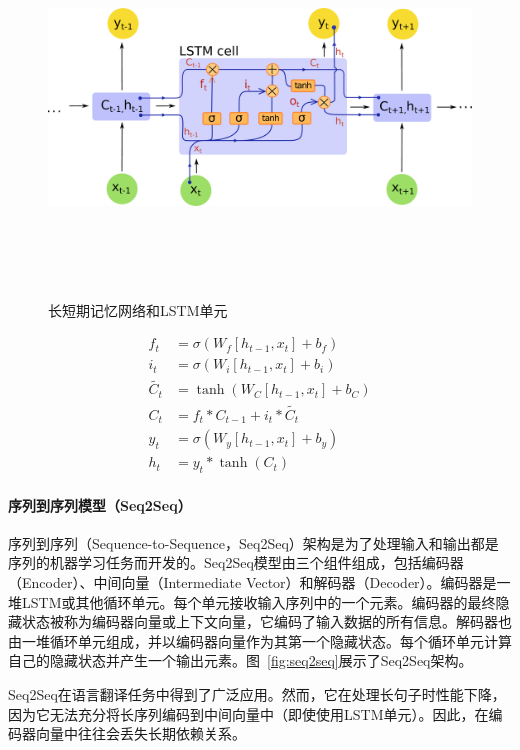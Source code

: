 \begin{figure}
\centering
\includegraphics[width=16cm,height=10cm,keepaspectratio]{lstm.pdf}
\caption{长短期记忆网络和LSTM单元}
\end{figure}
\begin{align*}
f_t &= \sigma(W_f [h_{t-1}, x_t] + b_f) \\
i_t &= \sigma(W_i [h_{t-1}, x_t] + b_i) \\
\tilde{C_t} &= \tanh(W_C [h_{t-1}, x_t] + b_C) \\
C_t &= f_t * C_{t-1} + i_t * \tilde{C_t} \\
y_t &= \sigma(W_y [h_{t-1}, x_t] + b_y) \\
h_t &= y_t * \tanh(C_t)
\end{align*}
\paragraph*{序列到序列模型（Seq2Seq）}
序列到序列（Sequence-to-Sequence，Seq2Seq）架构是为了处理输入和输出都是序列的机器学习任务而开发的。Seq2Seq模型由三个组件组成，包括编码器（Encoder）、中间向量（Intermediate Vector）和解码器（Decoder）。编码器是一堆LSTM或其他循环单元。每个单元接收输入序列中的一个元素。编码器的最终隐藏状态被称为编码器向量或上下文向量，它编码了输入数据的所有信息。解码器也由一堆循环单元组成，并以编码器向量作为其第一个隐藏状态。每个循环单元计算自己的隐藏状态并产生一个输出元素。图~\ref{fig:seq2seq}展示了Seq2Seq架构。

Seq2Seq在语言翻译任务中得到了广泛应用。然而，它在处理长句子时性能下降，因为它无法充分将长序列编码到中间向量中（即使使用LSTM单元）。因此，在编码器向量中往往会丢失长期依赖关系。


